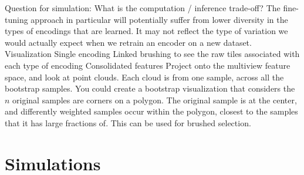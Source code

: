 \documentclass[11pt]{article}
\begin{document}
\begin{outline}
  \2 Question for simulation: What is the computation / inference trade-off?
    \3 The fine-tuning approach in particular will potentially suffer from
    lower diversity in the types of encodings that are learned. It may not
    reflect the type of variation we would actually expect when we retrain an
    encoder on a new dataset.
\1 Visualization
  \2 Single encoding
    \3 Linked brushing to see the raw tiles associated with each type of encoding
  \2 Consolidated features
    \3 Project onto the multiview feature space, and look at point clouds. Each
    cloud is from one sample, across all the bootstrap samples.
    \3 You could create a bootstrap visualization that considers the $n$
    original samples are corners on a polygon. The original sample is at the
    center, and differently weighted samples occur within the polygon, closest
    to the samples that it has large fractions of. This can be used for brushed
    selection.
\end{outline}

\section{Simulations}
\end{document}
